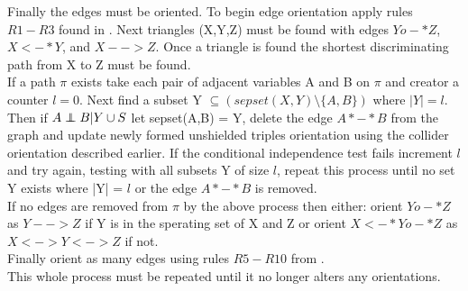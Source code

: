 \documentclass{article}
\newcommand\independent{\protect\mathpalette{\protect\independenT}{\perp}}
\def\independenT#1#2{\mathrel{\rlap{$#1#2$}\mkern2mu{#1#2}}}
\begin{document}
Finally the edges must be oriented. To begin edge orientation apply rules $R1-R3$ found in \cite{ZHANG20081873}. Next triangles (X,Y,Z) must be found with edges $Yo-*Z$, $X<-*Y$, and $X-->Z$. Once a triangle is found the shortest discriminating path from X to Z must be found.
\\

If a path $\pi$ exists take each pair of adjacent variables A and B on $\pi$ and creator a counter $l = 0$. Next find  a subset Y  $\subseteq (sepset(X,Y) \setminus \{A,B\})$ where $|Y| = l$. Then if $A \independent B | Y \cup S$ let sepset(A,B) = Y, delete the edge $A*-*B$ from the graph and update newly formed unshielded triples orientation using the collider orientation described earlier. If the conditional independence test fails increment $l$ and try again, testing with all subsets Y of size $l$, repeat this process until no set Y exists where |Y| = $l$ or the edge $A*-*B$ is removed. 
\\

If no edges are removed from $\pi$ by the above process then either: orient $Yo-*Z$ as $Y-->Z$ if Y is in the sperating set of X and Z or orient $X<-*Yo-*Z$ as $X<->Y<->Z$ if not.
\\

Finally orient as many edges using rules $R5-R10$ from \cite{ZHANG20081873}.
\\

This whole process must be repeated until it no longer alters any orientations.\cite{colombo2012learning}

{}

\end{document}
